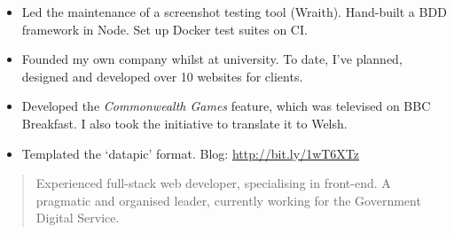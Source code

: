 \documentclass[10pt,a4paper,ragged2e,withhyper]{altacv}
\begin{document}
\begin{paracol}{2}
\divider


\begin{itemize}
    \item Led the maintenance of a screenshot testing tool (Wraith). Hand-built a BDD framework in Node. Set up Docker test suites on CI.
\end{itemize}

\divider


\begin{itemize}
    \item Founded my own company whilst at university. To date, I've planned, designed and developed over 10 websites for clients.
\end{itemize}

\divider


\begin{itemize}
    \item Developed the \emph{Commonwealth Games} feature, which was televised on BBC Breakfast. I also took the initiative to translate it to Welsh.
    \item Templated the ‘datapic’ format. Blog: \url{http://bit.ly/1wT6XTz}
\end{itemize}


\nocite{*}

\printbibliography[heading=pubtype,title={\printinfo{\faUsers}{Talks}},type=inproceedings]

\divider

\printbibliography[heading=pubtype,title={\printinfo{\faBook}{Books}},type=book]

\divider

\printbibliography[heading=pubtype,title={\printinfo{\faFile*[regular]}{Articles}}, type=misc]


\switchcolumn

\begin{quote}
Experienced full-stack web developer, specialising in front-end. A pragmatic and organised leader, currently working for the Government Digital Service.
\end{quote}


\end{paracol}
\end{document}
